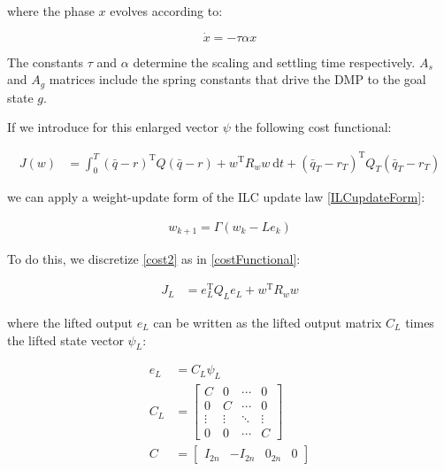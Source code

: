 \documentclass[10pt,a4paper]{article}
\newcommand{\joint}{q} %
\newcommand{\state}{\bar{\joint}} %
\newcommand{\error}{e} %
\newcommand{\traj}{r} %
\newcommand{\fullvec}{\psi} %
\newcommand{\phase}{x} %
\newcommand{\weights}{w} %
\newcommand{\qmatrix}{\Gamma} %
\newcommand{\lmatrix}{L} %
\newcommand{\ValueFunction}{J}
\begin{document}
where the phase $\phase$ evolves according to:

\begin{equation}
\dot{\phase} = -\tau\alpha\phase
\label{phase}
\end{equation}

The constants $\tau$ and $\alpha$ determine the scaling and settling time respectively. $A_s$ and $A_g$ matrices include the spring constants that drive the DMP to the goal state $g$.

If we introduce for this enlarged vector $\fullvec$ the following cost functional:

\begin{equation}
\begin{aligned}
J(\weights) &= \int_{0}^{T} (\state - \traj)^{\mathrm{T}}Q(\state - \traj) + \weights^{\mathrm{T}}R_w\weights \ \mathrm{d}t +  (\state_T-\traj_T)^{\mathrm{T}}Q_{T}(\state_T-\traj_T) 
\end{aligned}
\label{cost2}
\end{equation}

we can apply a weight-update form of the ILC update law \eqref{ILCupdateForm}:

\begin{equation}
\begin{aligned}
\weights_{k+1} = \qmatrix(\weights_{k} - \lmatrix\error_{k})
\end{aligned}
\label{ILCupdateFormWeights}
\end{equation}

To do this, we discretize \eqref{cost2} as in \eqref{costFunctional}:

\begin{equation}
\begin{aligned}
\ValueFunction_L &= \error_L^{\mathrm{T}}Q_L\error_L + \weights^{\mathrm{T}}R_w\weights
\end{aligned}
\label{costFunctionalWeights}
\end{equation}

where the lifted output $\error_L$ can be written as the lifted output matrix $C_L$ times the lifted state vector $\fullvec_L$:

\begin{equation}
\begin{aligned}
\error_L &= C_L \fullvec_L \\
C_L &= 
  \begin{bmatrix}
   C & 0 & \cdots & 0 \\
   0 & C & \cdots & 0 \\
   \vdots  & \vdots  & \ddots & \vdots  \\
   0 & 0 & \cdots & C
  \end{bmatrix} \\
C &= \begin{bmatrix}
  I_{2n} & -I_{2n} & 0_{2n} & 0
 \end{bmatrix}
\end{aligned}
\label{outputWeights}
\end{equation}
\end{document}
